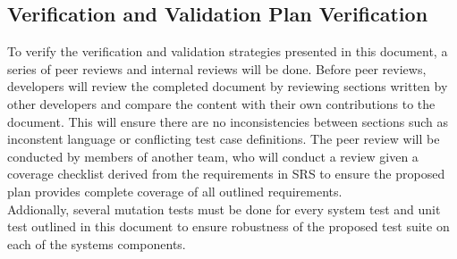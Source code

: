 \documentclass[12pt, titlepage]{article}
\begin{document}
\subsection{Verification and Validation Plan Verification}

To verify the verification and validation strategies presented in this document, a series of peer reviews and internal reviews will be done. Before peer reviews, developers will review the completed document by reviewing sections written by other developers and compare the content with their own contributions to the document. This will ensure there are no inconsistencies between sections such as inconstent language or conflicting test case definitions. The peer review will be conducted by members of another team, who will conduct a review given a coverage checklist derived from the requirements in SRS to ensure the proposed plan provides complete coverage of all outlined requirements.
\\
Addionally, several mutation tests must be done for every system test and unit test outlined in this document to ensure robustness of the proposed test suite on each of the systems components.
\end{document}
